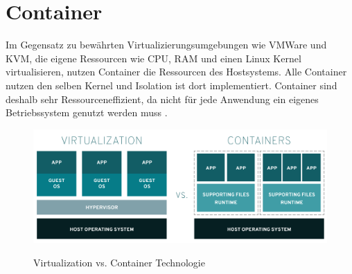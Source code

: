 \section{Container}
\label{sec:grundlagen:container}

Im Gegensatz zu bewährten Virtualizierungsumgebungen wie VMWare und KVM, 
die eigene Ressourcen wie CPU, RAM und einen Linux Kernel virtualisieren,
nutzen Container die Ressourcen des Hostsystems. 
Alle Container nutzen den selben Kernel und Isolation ist dort implementiert.
Container sind deshalb sehr Ressourceneffizient, da nicht für jede Anwendung ein eigenes
Betriebssystem genutzt werden muss \cite{Kane2018}.

\begin{figure}
  \includegraphics[width=\textwidth]{gfx/chapters/2_grundlagen/virtualization-vs-containers.png}
  \label{fig:container:vergleich}
  \caption{Virtualization vs. Container Technologie}
\end{figure}